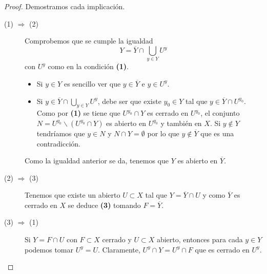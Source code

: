 \begin{proof}
Demostramos cada implicación.
\begin{description}
\item[(1) $\displaystyle \Rightarrow $ (2)] Comprobemos que se cumple la igualdad
	\[Y = \overline{Y}\cap \bigcup_{y \in Y}U^{y} \]
	con $\displaystyle U^{y} $ como en la condición \textbf{(1)}. 
	\begin{itemize}
	\item Si $\displaystyle y \in Y $ es sencillo ver que $\displaystyle y \in \overline{Y} $ e $\displaystyle y \in U^{y} $. 
	\item Si $\displaystyle y \in \overline{Y}\cap \bigcup_{y \in Y}U^{y} $, debe ser que existe $\displaystyle y_{0}\in Y $ tal que $\displaystyle y \in \overline{Y}\cap U^{y_{0}} $. Como por \textbf{(1)} se tiene que $\displaystyle U^{y_{0}}\cap Y $ es cerrado en $\displaystyle U^{y_{0}} $, el conjunto $\displaystyle N = U^{y_{0}} \backslash \left(U^{y_{0}} \cap Y\right) $ es abierto en $\displaystyle U^{y_{0}} $ y también en $\displaystyle X $. 
		Si $\displaystyle y \not\in Y $ tendríamos que $\displaystyle y\in N $ y $\displaystyle N \cap Y = \emptyset $ por lo que $\displaystyle y \not\in \overline{Y} $ que es una contradicción. 
	\end{itemize}
	Como la igualdad anterior se da, tenemos que $\displaystyle Y $ es abierto en $\displaystyle \overline{Y} $.
\item[(2) $\displaystyle \Rightarrow $ (3)] Tenemos que existe un abierto $\displaystyle U \subset X $ tal que $\displaystyle Y = \overline{Y}\cap U $ y como $\displaystyle \overline{Y} $ es cerrado en $\displaystyle X $ se deduce \textbf{(3)} tomando $\displaystyle F = \overline{Y} $.
\item[(3) $\displaystyle \Rightarrow $ (1)] Si $\displaystyle Y = F \cap U $ con $\displaystyle F \subset X $ cerrado y $\displaystyle U\subset X $ abierto, entonces para cada $\displaystyle y \in Y $ podemos tomar $\displaystyle U^{y}= U $. Claramente, $\displaystyle U^{y}\cap Y = U^{y}\cap F $ que es cerrado en $\displaystyle U^{y} $.
\end{description}
\end{proof}
